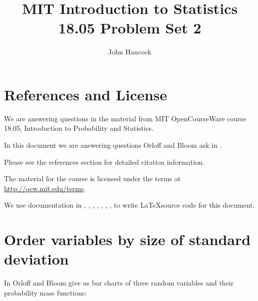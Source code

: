 \documentclass[a4paper,11pt]{article}
\author{John Hancock}
\title{MIT Introduction to Statistics 18.05 Problem Set 2 }
\begin{document}
\maketitle
\tableofcontents
\section{References and License}
We are answering questions in the material from MIT OpenCourseWare
course 18.05, Introduction to Probability and Statistics.

In this document we are answering questions Orloff and Bloom ask in
\cite{slides5}.

Please see the references section for detailed citation information.

The material for the course is licensed under the terms at
\url{http://ocw.mit.edu/terms}.

We use documentation in \cite{latexBarChart}, \cite{evalInt}, \cite{pfgPlots},
\cite{noDots}, \cite{normalDist}, \cite{tikzNormal}, \cite{shading},
\cite{moreShading}
to write \LaTeX source code for this document.
\section{Order variables by size of standard deviation}

In \cite{slides5} Orloff and Bloom give us bar charts of three random variables
and their probability mass functions:


\end{document}
